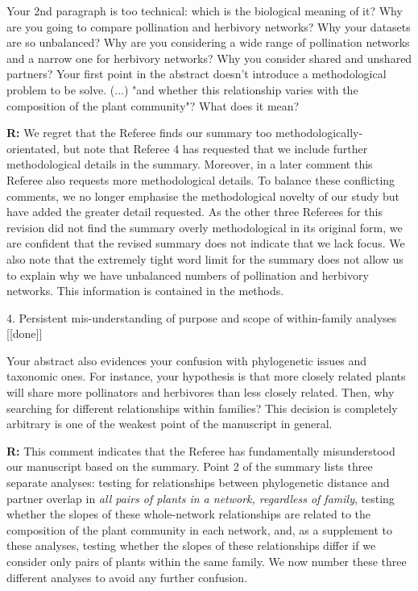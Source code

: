 \documentclass[12pt]{letter}
\newenvironment{refquote}{\bigskip \begin{it}}{\end{it}\smallskip}
\begin{document}
		\begin{refquote}
			Your 2nd paragraph is too technical: which is the biological meaning of it? Why are you going to compare pollination and herbivory networks? Why your datasets are so unbalanced? Why are you considering a wide range of pollination networks and a narrow one for herbivory networks? Why you consider shared and unshared partners? Your first point in the abstract doesn't introduce a methodological problem to be solve. (...) "and whether this relationship varies with the composition of the plant community"? What does it mean?
		\end{refquote}


		\textbf{R:} We regret that the Referee finds our summary too methodologically-orientated, but note that Referee 4 has requested that we include further methodological details in the summary. Moreover, in a later comment this Referee also requests more methodological details. To balance these conflicting comments, we no longer emphasise the methodological novelty of our study but have added the greater detail requested. As the other three Referees for this revision did not find the summary overly methodological in its original form, we are confident that the revised summary does not indicate that we lack focus. We also note that the extremely tight word limit for the summary does not allow us to explain why we have unbalanced numbers of pollination and herbivory networks. This information is contained in the methods. 


	4. Persistent mis-understanding of purpose and scope of within-family analyses [[done]]

		\begin{refquote}
		Your abstract also evidences your confusion with phylogenetic issues and taxonomic ones. For instance, your hypothesis is that more closely related plants will share more pollinators and herbivores than less closely related. Then, why searching for different relationships within families? This decision is completely arbitrary is one of the weakest point of the manuscript in general.
		\end{refquote}


		\textbf{R:} This comment indicates that the Referee has fundamentally misunderstood our manuscript based on the summary. Point 2 of the summary lists three separate analyses: testing for relationships between phylogenetic distance and partner overlap in \emph{all pairs of plants in a network, regardless of family}, testing whether the slopes of these whole-network relationships are related to the composition of the plant community in each network, and, as a supplement to these analyses, testing whether the slopes of these relationships differ if we consider only pairs of plants within the same family. We now number these three different analyses to avoid any further confusion. 
\end{document}

